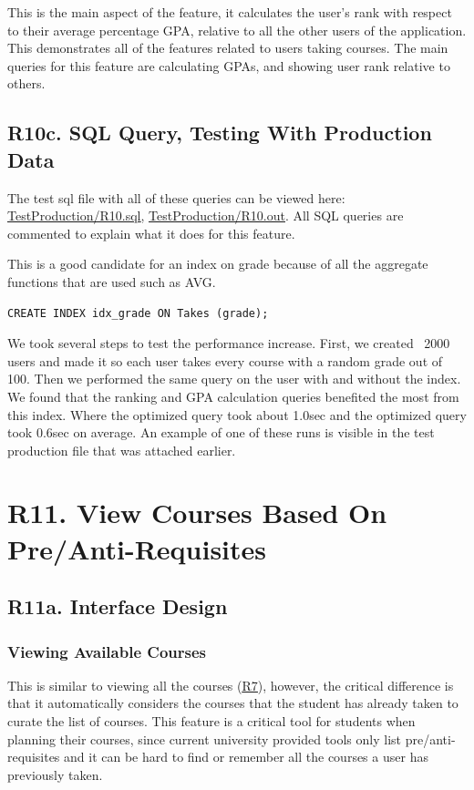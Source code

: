\documentclass[12pt, a4paper]{article}
\begin{document}
This is the main aspect of the feature, it calculates the user's rank with respect to their average percentage GPA, relative to all the other users of the application.\\
This demonstrates all of the features related to users taking courses. The main queries for this feature are calculating GPAs, and showing user rank relative to others.
\subsection*{R10c. SQL Query, Testing With Production Data}
The test sql file with all of these queries can be viewed here: \underline{\href{https://github.com/Kggupta/DegreeMap/tree/main/Database/Queries/TestProduction}{TestProduction/R10.sql}}, \underline{\href{https://github.com/Kggupta/DegreeMap/tree/main/Database/Queries/TestProduction}{TestProduction/R10.out}}. All SQL queries are commented to explain what it does for this feature.

This is a good candidate for an index on grade because of all the aggregate functions that are used such as AVG.
\begin{verbatim}
CREATE INDEX idx_grade ON Takes (grade);
\end{verbatim}

We took several steps to test the performance increase. First, we created ~2000 users and made it so each user takes every course with a random grade out of 100. Then we performed the same query on the user with and without the index. We found that the ranking and GPA calculation queries benefited the most from this index. Where the optimized query took about 1.0sec and the optimized query took 0.6sec on average. An example of one of these runs is visible in the test production file that was attached earlier.
\section*{R11. View Courses Based On Pre/Anti-Requisites}
\label{sec:R11}
\subsection*{R11a. Interface Design}
\subsubsection*{Viewing Available Courses}
This is similar to viewing all the courses (\underline{\hyperref[sec:R7]{R7}}), however, the critical difference is that it automatically considers the courses that the student has already taken to curate the list of courses. This feature is a critical tool for students when planning their courses, since current university provided tools only list pre/anti-requisites and it can be hard to find or remember all the courses a user has previously taken.\\
\end{document}
